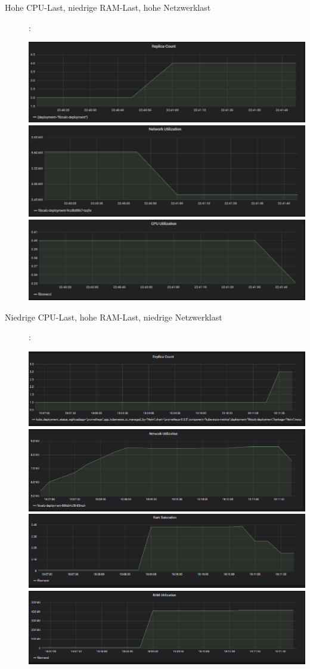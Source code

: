 \documentclass[a4paper,10pt]{scrartcl}
\begin{document}
\begin{description}

\item[Hohe CPU-Last, niedrige RAM-Last, hohe Netzwerklast]:\\

\begin{minipage}{\linewidth}
            \includegraphics[width=.5\textwidth]{img/CPUSkalierung/ReplicaCount.PNG}
            \includegraphics[scale=1,width=.5\textwidth,height=.14\textheight]{img/CPUSkalierung/NetzwerkUtilization.PNG}
  			\includegraphics[scale=1,width=.5\textwidth]{img/CPUSkalierung/CPUUtilization.PNG}
\end{minipage}

\pagebreak

\item[Niedrige CPU-Last, hohe RAM-Last, niedrige Netzwerklast]:\\
\begin{minipage}{\linewidth}
            \includegraphics[width=.5\textwidth]{img/RAMSkalierung/Replica-Count.PNG}
            \includegraphics[scale=1,width=.5\textwidth,height=.14\textheight]{img/RAMSkalierung/Netzwerk.PNG}
  			\includegraphics[scale=1,width=.5\textwidth]{img/RAMSkalierung/RAMSaturation.PNG}
  			\includegraphics[scale=1,width=.5\textwidth]{img/RAMSkalierung/RAMUtilization.PNG}
\end{minipage}


\end{description}
\end{document}
